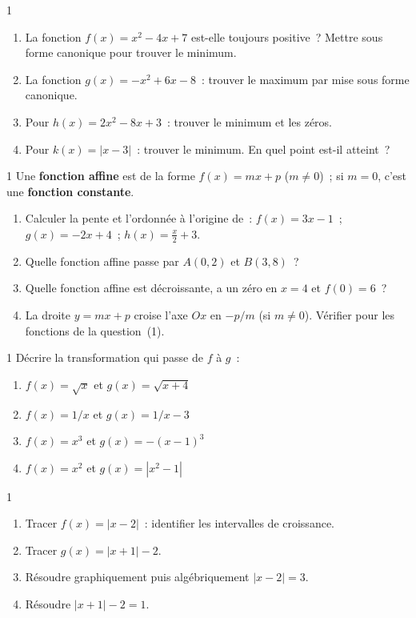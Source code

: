 \begin{exo}{1}
\begin{enumerate}
  \item La fonction $f(x)=x^2-4x+7$ est-elle toujours positive~?
        Mettre sous forme canonique pour trouver le minimum.
  \item La fonction $g(x)=-x^2+6x-8$~: trouver le maximum par
        mise sous forme canonique.
  \item Pour $h(x)=2x^2-8x+3$~: trouver le minimum et les z\'eros.
  \item Pour $k(x)=|x-3|$~: trouver le minimum. En quel point est-il atteint~?
\end{enumerate}
\end{exo}

\begin{exo}{1}
Une \textbf{fonction affine} est de la forme $f(x)=mx+p$ ($m\ne0$)~;
si $m=0$, c'est une \textbf{fonction constante}.
\begin{enumerate}
  \item Calculer la pente et l'ordonn\'ee \`a l'origine de~:
        $f(x)=3x-1$~; $g(x)=-2x+4$~; $h(x)=\frac{x}{2}+3$.
  \item Quelle fonction affine passe par $A(0,2)$ et $B(3,8)$~?
  \item Quelle fonction affine est d\'ecroissante, a un z\'ero en $x=4$
        et $f(0)=6$~?
  \item La droite $y=mx+p$ croise l'axe $Ox$ en $-p/m$ (si $m\ne0$).
        V\'erifier pour les fonctions de la question~(1).
\end{enumerate}
\end{exo}

\begin{exo}{1}
D\'ecrire la transformation qui passe de $f$ \`a $g$~:
\begin{enumerate}
  \item $f(x)=\sqrt{x}$ et $g(x)=\sqrt{x+4}$
  \item $f(x)=1/x$ et $g(x)=1/x-3$
  \item $f(x)=x^3$ et $g(x)=-(x-1)^3$
  \item $f(x)=x^2$ et $g(x)=|x^2-1|$
\end{enumerate}
\end{exo}

\begin{exo}{1}
\begin{enumerate}
  \item Tracer $f(x)=|x-2|$~: identifier les intervalles de croissance.
  \item Tracer $g(x)=|x+1|-2$.
  \item R\'esoudre graphiquement puis alg\'ebriquement $|x-2|=3$.
  \item R\'esoudre $|x+1|-2=1$.
\end{enumerate}
\end{exo}


